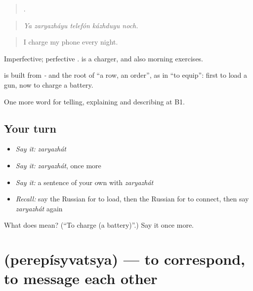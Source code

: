 \begin{quote}
    .
\end{quote}

\begin{quote}
\emph{Ya zaryazháyu telefón kázhduyu noch.}
\end{quote}

\begin{quote}
I charge my phone every night.
\end{quote}

Imperfective; perfective \emph{}. \emph{} is a charger, and also morning exercises.

\begin{cousinweb}
\textbf{} is built from \emph{-} and the root of \emph{} \textquotedblleft{}a row, an order\textquotedblright{}, as in \emph{} \textquotedblleft{}to equip\textquotedblright{}: first to load a gun, now to charge a battery.
\end{cousinweb}

\begin{grammarlens}[title={What you've built}]
One more word for telling, explaining and describing at B1.
\end{grammarlens}

\subsection*{Your turn}
\begin{itemize}
\raggedright
  \item \emph{Say it:} \emph{zaryazhát}
  \item \emph{Say it:} \emph{zaryazhát}, once more
  \item \emph{Say it:} a sentence of your own with \emph{zaryazhát}
  \item \emph{Recall:} say the Russian for to load, then the Russian for to connect, then say \emph{zaryazhát} again
\end{itemize}

\begin{tcolorbox}[breakable,colback=teal!4,colframe=teal!35!black,title={Before you move on}]
What does  mean? (\textquotedblleft{}To charge (a battery)\textquotedblright{}.) Say it once more.
\end{tcolorbox}
\section[\texorpdfstring{\ru{переписываться} (perepísyvatsya)}{переписываться (perepísyvatsya)}]{ (perepísyvatsya) — to correspond, to message each other}

